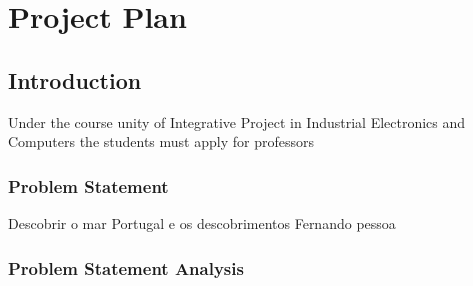 \chapter{Project Plan}
\section{Introduction}
Under the course unity of Integrative Project in Industrial Electronics and Computers the students must
apply for professors 
\subsection{Problem Statement}
Descobrir o mar
Portugal e os descobrimentos
Fernando pessoa
\subsection{Problem Statement Analysis}

